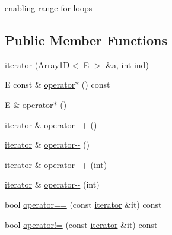 enabling range for loops \subsection*{Public Member Functions}
\begin{DoxyCompactItemize}
\item 
\mbox{\hyperlink{classbridges_1_1datastructure_1_1_array1_d_1_1iterator_a5bfe7e8948825c5814a95b05551496e4}{iterator}} (\mbox{\hyperlink{classbridges_1_1datastructure_1_1_array1_d}{Array1D}}$<$ E $>$ \&a, int ind)
\item 
E const  \& \mbox{\hyperlink{classbridges_1_1datastructure_1_1_array1_d_1_1iterator_a847f7a113b05007499eac3dca011ba5d}{operator$\ast$}} () const
\item 
E \& \mbox{\hyperlink{classbridges_1_1datastructure_1_1_array1_d_1_1iterator_aa95730146a48c7d753334fdcfddfbd84}{operator$\ast$}} ()
\item 
\mbox{\hyperlink{classbridges_1_1datastructure_1_1_array1_d_1_1iterator}{iterator}} \& \mbox{\hyperlink{classbridges_1_1datastructure_1_1_array1_d_1_1iterator_a1d8394de4e75cf1dffd1465beba2f85a}{operator++}} ()
\item 
\mbox{\hyperlink{classbridges_1_1datastructure_1_1_array1_d_1_1iterator}{iterator}} \& \mbox{\hyperlink{classbridges_1_1datastructure_1_1_array1_d_1_1iterator_ae63ca794e437c96e713a5c51844766f9}{operator-\/-\/}} ()
\item 
\mbox{\hyperlink{classbridges_1_1datastructure_1_1_array1_d_1_1iterator}{iterator}} \& \mbox{\hyperlink{classbridges_1_1datastructure_1_1_array1_d_1_1iterator_a113e2d57db9888db18681558b6ddd4c2}{operator++}} (int)
\item 
\mbox{\hyperlink{classbridges_1_1datastructure_1_1_array1_d_1_1iterator}{iterator}} \& \mbox{\hyperlink{classbridges_1_1datastructure_1_1_array1_d_1_1iterator_a600898496da4155d0c58399cf9d1b4cf}{operator-\/-\/}} (int)
\item 
bool \mbox{\hyperlink{classbridges_1_1datastructure_1_1_array1_d_1_1iterator_a59e1cdad748d872e7d07a26009a5a596}{operator==}} (const \mbox{\hyperlink{classbridges_1_1datastructure_1_1_array1_d_1_1iterator}{iterator}} \&it) const
\item 
bool \mbox{\hyperlink{classbridges_1_1datastructure_1_1_array1_d_1_1iterator_ab9e885078d2bb6068efa5ef899b7e32b}{operator!=}} (const \mbox{\hyperlink{classbridges_1_1datastructure_1_1_array1_d_1_1iterator}{iterator}} \&it) const
\end{DoxyCompactItemize}


